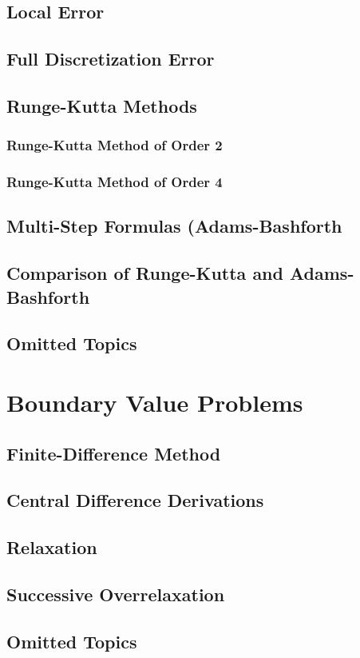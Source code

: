 \subsection{Local Error}

\subsection{Full Discretization Error}

\subsection{Runge-Kutta Methods}

\subsubsection{Runge-Kutta Method of Order 2}

\subsubsection{Runge-Kutta Method of Order 4}

\subsection{Multi-Step Formulas (Adams-Bashforth}

\subsection{Comparison of Runge-Kutta and Adams-Bashforth}

\subsection{Omitted Topics}

\section{Boundary Value Problems}

\subsection{Finite-Difference Method}

\subsection{Central Difference Derivations}

\subsection{Relaxation}

\subsection{Successive Overrelaxation}

\subsection{Omitted Topics}